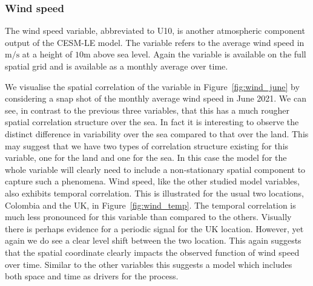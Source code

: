 \subsubsection{Wind speed \label{sssec:wind}}
The wind speed variable, abbreviated to U10, is another atmospheric component output of the CESM-LE model.
The variable refers to the average wind speed in $\si{\meter\per\second}$ at a height of $10\si{\meter}$ above sea level.
Again the variable is available on the full spatial grid and is available as a monthly average over time.

We visualise the spatial correlation of the variable in Figure~\ref{fig:wind_june} by considering a snap shot of the monthly average wind speed in June 2021.
We can see, in contrast to the previous three variables, that this has a much rougher spatial correlation structure over the sea. 
In fact it is interesting to observe the distinct difference in variability over the sea compared to that over the land. 
This may suggest that we have two types of correlation structure existing for this variable, one for the land and one for the sea. 
In this case the model for the whole variable will clearly need to include a non-stationary spatial component to capture such a phenomena.
Wind speed, like the other studied model variables, also exhibits temporal correlation. 
This is illustrated for the usual two locations, Colombia and the UK, in Figure~\ref{fig:wind_temp}. 
The temporal correlation is much less pronounced for this variable than compared to the others. 
Visually there is perhaps evidence for a periodic signal for the UK location. 
However, yet again we do see a clear level shift between the two location. 
This again suggests that the spatial coordinate clearly impacts the observed function of wind speed over time.
Similar to the other variables this suggests a model which includes both space and time as drivers for the process.

